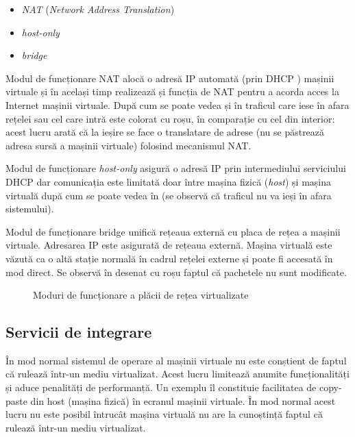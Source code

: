 \begin{itemize}
  \item \textit{NAT} (\textit{Network Address Translation})
  \item \textit{host-only}
  \item \textit{bridge}
\end{itemize}

Modul de funcționare NAT alocă o adresă IP automată (prin DHCP
) mașinii virtuale și în
același timp realizează și funcția de NAT pentru a acorda acces la Internet
mașinii virtuale. După cum se poate vedea și în
 traficul care iese în afara rețelei sau cel
care intră este colorat cu roșu, în comparație cu cel din interior: acest lucru
arată că la ieșire se face o translatare de adrese (nu se
păstrează adresa sursă a mașinii virtuale) folosind mecanismul NAT.

Modul de funcționare \textit{host-only} asigură o adresă IP prin intermediului
serviciului DHCP dar comunicația este limitată doar între mașina fizică (\textit{host})
și mașina virtuală după cum se poate vedea în 
(se observă că traficul nu va ieși în afara sistemului).

Modul de funcționare bridge unifică rețeaua externă cu placa de rețea a mașinii
virtuale. Adresarea IP este asigurată de rețeaua externă. Mașina virtuală este
văzută ca o altă stație normală în cadrul rețelei externe și poate fi accesată
în mod direct. Se observă în  desenat cu roșu
faptul că pachetele nu sunt modificate.

\begin{figure}[htbp]
	\centering
	\def\svgwidth{\columnwidth}
	
	\caption{Moduri de funcționare a plăcii de rețea virtualizate}
	\label{fig:vm:net}
\end{figure}

\subsection{Servicii de integrare}
\label{sec:vm:ops:services}

În mod normal sistemul de operare al mașinii virtuale nu este conștient de
faptul că rulează într-un mediu virtualizat. Acest lucru limitează anumite
funcționalități și aduce penalități de performanță. Un exemplu îl constituie
facilitatea de copy-paste din host (mașina fizică) în ecranul mașinii
virtuale. În mod normal acest lucru nu este posibil întrucât mașina virtuală nu
are la cunoștință faptul că rulează într-un mediu virtualizat.

